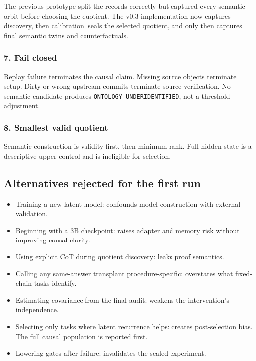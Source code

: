 \documentclass[
  10pt,
]{article}
\providecommand{\tightlist}{%
  \setlength{\itemsep}{0pt}\setlength{\parskip}{0pt}}
\begin{document}
The previous prototype split the records correctly but captured every
semantic orbit before choosing the quotient. The v0.3 implementation now
captures discovery, then calibration, seals the selected quotient, and
only then captures final semantic twins and counterfactuals.

\subsubsection{7. Fail closed}\label{fail-closed}

Replay failure terminates the causal claim. Missing source objects
terminate setup. Dirty or wrong upstream commits terminate source
verification. No semantic candidate produces
\texttt{ONTOLOGY\_UNDERIDENTIFIED}, not a threshold adjustment.

\subsubsection{8. Smallest valid
quotient}\label{smallest-valid-quotient}

Semantic construction is validity first, then minimum rank. Full hidden
state is a descriptive upper control and is ineligible for selection.

\subsection{Alternatives rejected for the first
run}\label{alternatives-rejected-for-the-first-run}

\begin{itemize}
\tightlist
\item
  Training a new latent model: confounds model construction with
  external validation.
\item
  Beginning with a 3B checkpoint: raises adapter and memory risk without
  improving causal clarity.
\item
  Using explicit CoT during quotient discovery: leaks proof semantics.
\item
  Calling any same-answer transplant procedure-specific: overstates what
  fixed-chain tasks identify.
\item
  Estimating covariance from the final audit: weakens the intervention's
  independence.
\item
  Selecting only tasks where latent recurrence helps: creates
  post-selection bias. The full causal population is reported first.
\item
  Lowering gates after failure: invalidates the sealed experiment.
\end{itemize}
\end{document}
